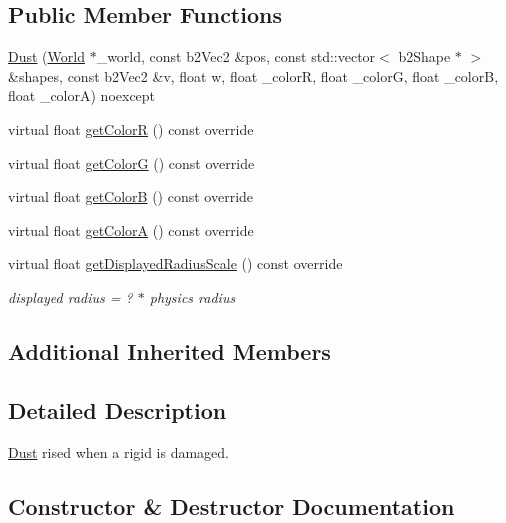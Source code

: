 \subsection*{Public Member Functions}
\begin{DoxyCompactItemize}
\item 
\hyperlink{classDust_a43719fa4b8745b2bd2eb72f2590786c2}{Dust} (\hyperlink{classWorld}{World} $\ast$\+\_\+world, const b2\+Vec2 \&pos, const std\+::vector$<$ b2\+Shape $\ast$ $>$ \&shapes, const b2\+Vec2 \&v, float w, float \+\_\+color\+R, float \+\_\+color\+G, float \+\_\+color\+B, float \+\_\+color\+A) noexcept
\item 
virtual float \hyperlink{classDust_a2e5d596ac110553eb401eae59641fb5a}{get\+Color\+R} () const override
\item 
virtual float \hyperlink{classDust_a386313dcd344747fb28bb809f6243bf8}{get\+Color\+G} () const override
\item 
virtual float \hyperlink{classDust_a088431d5f6a114d93f12cae63592a8dd}{get\+Color\+B} () const override
\item 
virtual float \hyperlink{classDust_a6a61ed84ae1cbba8d0cdbc102a343f0f}{get\+Color\+A} () const override
\item 
virtual float \hyperlink{classDust_a6e96475d0b48ffcfb443c014ad369276}{get\+Displayed\+Radius\+Scale} () const override
\begin{DoxyCompactList}\small\item\em displayed radius = ? $\ast$ physics radius \end{DoxyCompactList}\end{DoxyCompactItemize}
\subsection*{Additional Inherited Members}


\subsection{Detailed Description}
\hyperlink{classDust}{Dust} rised when a rigid is damaged. 

\subsection{Constructor \& Destructor Documentation}
\hypertarget{classDust_a43719fa4b8745b2bd2eb72f2590786c2}{}
